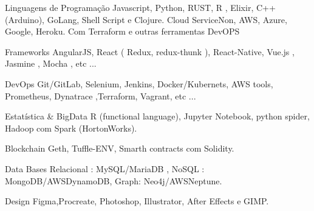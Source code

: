 \vspace{5mm}

\begin{cvskills}

  \cvskill
    {Linguagens de Programação} %
    {Javascript, Python, RUST, R , Elixir, C++ (Arduino), GoLang, Shell Script e Clojure.} %
  \cvskill
    {Cloud} %
    { ServiceNon, AWS, Azure, Google, Heroku. Com Terraform e outras ferramentas DevOPS} %

  \cvskill
    {Frameworks} %
    {AngularJS, React ( Redux, redux-thunk ), React-Native, Vue.js , Jasmine , Mocha ,  etc ...} %

\cvskill
    {DevOps} %
    {Git/GitLab, Selenium, Jenkins, Docker/Kubernets, AWS tools, Prometheus, Dynatrace ,Terraform, Vagrant, etc ...} %

 \cvskill
    {Estatística \& BigData} %
    { R (functional language), Jupyter Notebook, python spider, Hadoop com Spark (HortonWorks).
    } %

 \cvskill
    {Blockchain} %
    { Geth, Tuffle-ENV, Smarth contracts com Solidity.} %

 \cvskill
    {Data Bases} %
    {Relacional : MySQL/MariaDB , NoSQL : MongoDB/AWSDynamoDB, Graph: Neo4j/AWSNeptune.} %

 \cvskill
    {Design} %
    {Figma,Procreate, Photoshop, Illustrator, After Effects e GIMP.} %
    

\end{cvskills}
